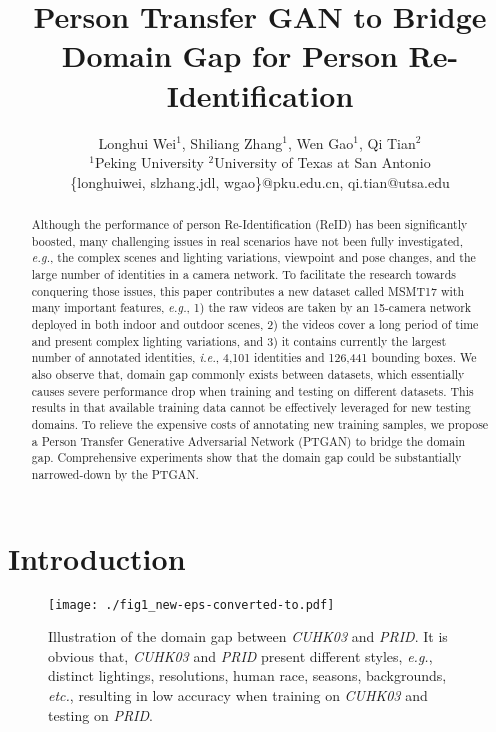 \documentclass[10pt,twocolumn,letterpaper]{article}
\begin{document}
\title{Person Transfer GAN to Bridge Domain Gap for Person Re-Identification}

\author{Longhui Wei$^1$, Shiliang Zhang$^1$, Wen Gao$^1$, Qi Tian$^2$\\
\normalsize{$^1$Peking University}       \quad \normalsize{$^2$University of Texas at San Antonio}\\
\small{\{longhuiwei, slzhang.jdl, wgao\}@pku.edu.cn, qi.tian@utsa.edu}
}



\maketitle


\begin{abstract}
Although the performance of person Re-Identification (ReID) has been significantly boosted, many challenging issues in real scenarios have not been fully investigated, \emph{e.g.}, the complex scenes and lighting variations, viewpoint and pose changes, and the large number of identities in a camera network. To facilitate the research towards conquering those issues, this paper contributes a new dataset called MSMT17 with many important features, \emph{e.g.}, 1) the raw videos are taken by an 15-camera network deployed in both indoor and outdoor scenes, 2) the videos cover a long period of time and present complex lighting variations, and 3) it contains currently the largest number of annotated identities, \emph{i.e.}, 4,101 identities and 126,441 bounding boxes. We also observe that, domain gap commonly exists between datasets, which essentially causes severe performance drop when training and testing on different datasets. This results in that available training data cannot be effectively leveraged for new testing domains. To relieve the expensive costs of annotating new training samples, we propose a Person Transfer Generative Adversarial Network (PTGAN) to bridge the domain gap. Comprehensive experiments show that the domain gap could be substantially narrowed-down by the PTGAN.
\end{abstract}

\section{Introduction}

\begin{figure}
\begin{center}
\texttt{[image: ./fig1\_new-eps-converted-to.pdf]}
\end{center}
  \vspace{-3mm}
\caption{Illustration of the domain gap between \emph{CUHK03} and \emph{PRID}. It is obvious that, \emph{CUHK03} and \emph{PRID} present different styles, \emph{e.g.}, distinct lightings, resolutions, human race, seasons, backgrounds, \emph{etc.}, resulting in low accuracy when training on \emph{CUHK03} and testing on \emph{PRID}.}
\label{fig:fig1}
\end{figure}
\end{document}
